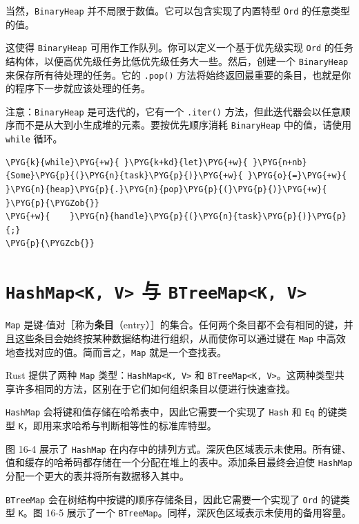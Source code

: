 当然，\texttt{BinaryHeap} 并不局限于数值。它可以包含实现了内置特型 \texttt{Ord} 的任意类型的值。

这使得 \texttt{BinaryHeap} 可用作工作队列。你可以定义一个基于优先级实现 \texttt{Ord} 的任务结构体，以便高优先级任务比低优先级任务大一些。然后，创建一个 \texttt{BinaryHeap} 来保存所有待处理的任务。它的 \texttt{.pop()} 方法将始终返回最重要的条目，也就是你的程序下一步就应该处理的任务。

注意：\texttt{BinaryHeap} 是可迭代的，它有一个 \texttt{.iter()} 方法，但此迭代器会以任意顺序而不是从大到小生成堆的元素。要按优先顺序消耗 \texttt{BinaryHeap} 中的值，请使用 \texttt{while} 循环。

\begin{Verbatim}[commandchars=\\\{\},breaklines=true,breakanywhere=true,fontsize=\codefont,xleftmargin=17bp]
\PYG{k}{while}\PYG{+w}{ }\PYG{k+kd}{let}\PYG{+w}{ }\PYG{n+nb}{Some}\PYG{p}{(}\PYG{n}{task}\PYG{p}{)}\PYG{+w}{ }\PYG{o}{=}\PYG{+w}{ }\PYG{n}{heap}\PYG{p}{.}\PYG{n}{pop}\PYG{p}{(}\PYG{p}{)}\PYG{+w}{ }\PYG{p}{\PYGZob{}}
\PYG{+w}{    }\PYG{n}{handle}\PYG{p}{(}\PYG{n}{task}\PYG{p}{)}\PYG{p}{;}
\PYG{p}{\PYGZcb{}}
\end{Verbatim}

\section{\texttt{HashMap<K, V>} 与 \texttt{BTreeMap<K, V>}}

\texttt{Map} 是键-值对［称为\textbf{条目}（entry）］的集合。任何两个条目都不会有相同的键，并且这些条目会始终按某种数据结构进行组织，从而使你可以通过键在 \texttt{Map} 中高效地查找对应的值。简而言之，\texttt{Map} 就是一个查找表。

Rust 提供了两种 \texttt{Map} 类型：\texttt{HashMap<K, V>} 和 \texttt{BTreeMap<K, V>}。这两种类型共享许多相同的方法，区别在于它们如何组织条目以便进行快速查找。

\texttt{HashMap} 会将键和值存储在哈希表中，因此它需要一个实现了 \texttt{Hash} 和 \texttt{Eq} 的键类型 \texttt{K}，即用来求哈希与判断相等性的标准库特型。

图 16-4 展示了 \texttt{HashMap} 在内存中的排列方式。深灰色区域表示未使用。所有键、值和缓存的哈希码都存储在一个分配在堆上的表中。添加条目最终会迫使 \texttt{HashMap} 分配一个更大的表并将所有数据移入其中。


\texttt{BTreeMap} 会在树结构中按键的顺序存储条目，因此它需要一个实现了 \texttt{Ord} 的键类型 \texttt{K}。图 16-5 展示了一个 \texttt{BTreeMap}。同样，深灰色区域表示未使用的备用容量。

